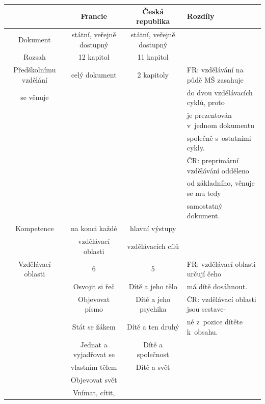 \begin{landscape}
\begin{table}[t]
\center
\begin{tabular}{|c|c|c|l|}
\rowcolor{grey}
\hline			
				& \textbf{Francie}			& \textbf{Česká republika}	& \textbf{Rozdíly} 	\\
\hline
\hline
\rowcolor{grey!10}
Dokument	& státní, veřejně dostupný		& státní, veřejně dostupný 	& 			\\	\rowcolor{grey!50}
Rozsah		& 12 kapitol	 				& 11 kapitol	&						\\  \rowcolor{grey!10}
Předškolnímu vzdělání	& celý dokument			& 2 kapitoly	& FR: vzdělávání na půdě MŠ  zasahuje 	\\ \rowcolor{grey!10}
se věnuje				&						&				& do dvou vzdělávacích cyklů, proto  	\\ \rowcolor{grey!10}
				&								& 				& je prezentován v~jednom dokumentu  	\\ \rowcolor{grey!10}
				&								&				& společně s~ostatními cykly.    		\\ \rowcolor{grey!10}
				&								&				& ČR: preprimární vzdělávání odděleno 	\\ \rowcolor{grey!10}
				&								&				& od základního, věnuje se mu tedy  	\\ \rowcolor{grey!10}
				&								&				& samostatný dokument.					\\ 
\rowcolor{grey!50}
Kompetence		& na konci každé 				& hlavní výstupy  	&		\\	\rowcolor{grey!50}
				& vzdělávací oblasti 			& vzdělávacích cílů & 		\\
\rowcolor{grey!10}
Vzdělávací oblasti	& 6							& 5 					& FR: vzdělávací oblasti určují čeho 	\\	
\rowcolor{grey!10}
					& Osvojit si řeč			& Dítě a jeho tělo		& má dítě dosáhnout.					\\
\rowcolor{grey!10}
					& Objevovat písmo 			& Dítě a jeho psychika	& ČR: vzdělávací oblasti jsou sestave- \\
\rowcolor{grey!10}
					& Stát se žákem				& Dítě a ten druhý	 	& né z~pozice dítěte k~obsahu. 			\\
\rowcolor{grey!10}
					& Jednat a vyjadřovat se 	& Dítě a společnost 	& 	 									\\
\rowcolor{grey!10}
					& vlastním tělem			& Dítě a svět			& 	 									\\
\rowcolor{grey!10}
					& Objevovat svět			& 			 			& 	\\	
\rowcolor{grey!10}
					& Vnímat, cítit, 			& 						& 	\\

\end{tabular}
\end{table}
\end{landscape}
